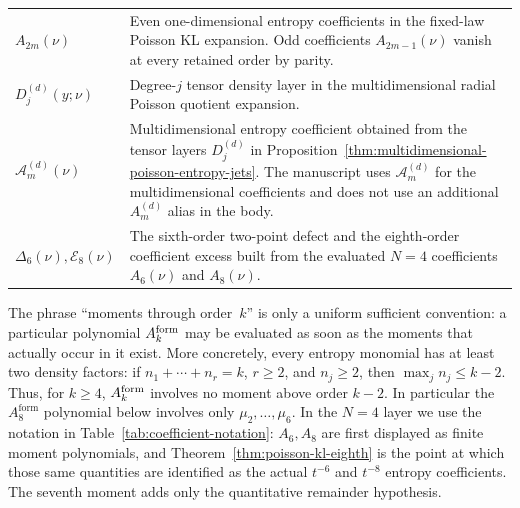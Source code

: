 \begin{table}[t]
\begin{tabular}{p{}p{}}
\(A_{2m}(\nu)\) & Even one-dimensional entropy coefficients in the fixed-law
Poisson KL expansion.  Odd coefficients \(A_{2m-1}(\nu)\) vanish at every
retained order by parity. \\
\(D_j^{(d)}(y;\nu)\) & Degree-\(j\) tensor density layer in the
multidimensional radial Poisson quotient expansion. \\
\(\mathcal A_m^{(d)}(\nu)\) & Multidimensional entropy coefficient obtained
from the tensor layers \(D_j^{(d)}\) in
Proposition~\ref{thm:multidimensional-poisson-entropy-jets}.  The manuscript uses
\(\mathcal A_m^{(d)}\) for the multidimensional coefficients and does not use
an additional \(A_m^{(d)}\) alias in the body. \\
\(\Delta_6(\nu),\mathcal E_8(\nu)\) & The sixth-order two-point defect and
the eighth-order coefficient excess built from the evaluated \(N=4\)
coefficients \(A_6(\nu)\) and \(A_8(\nu)\). \\
\hline
\end{tabular}
\end{table}

The phrase ``moments through order~$k$'' is only a uniform sufficient
convention: a particular polynomial $A_k^{\rm form}$ may be evaluated as soon
as the moments that actually occur in it exist.  More concretely, every
entropy monomial has at least two density factors: if
\(n_1+\cdots+n_r=k\), \(r\ge2\), and \(n_j\ge2\), then
\(\max_j n_j\le k-2\).  Thus, for \(k\ge4\), \(A_k^{\rm form}\) involves no
moment above order \(k-2\).  In particular the \(A^{\mathrm{form}}_8\)
polynomial below involves only \(\mu_2,\ldots,\mu_6\).  In the \(N=4\) layer
we use the notation in Table~\ref{tab:coefficient-notation}: \(A_6,A_8\) are
first displayed as finite moment polynomials, and
Theorem~\ref{thm:poisson-kl-eighth} is the point at which those same
quantities are identified as the actual \(t^{-6}\) and \(t^{-8}\) entropy
coefficients.  The seventh moment adds only the quantitative remainder
hypothesis.

